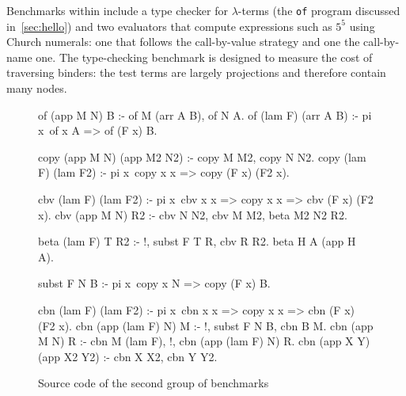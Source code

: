 \documentclass{these-ISSS}
\newenvironment{elpicode}
  {\VerbatimEnvironment\begin{elpibox}\begin{xelpicode}}{\end{xelpicode}
\end{elpibox}}
\begin{document}
Benchmarks within \thefragment{} include a type checker for $\lambda$-terms
(the \verb+of+ program discussed in~\cref{sec:hello}) and two evaluators that
compute expressions such as $5^5$ using Church numerals: one that follows
the call-by-value strategy and one the call-by-name one. The
type-checking benchmark is designed to measure the cost of traversing
binders: the test terms are largely projections and therefore contain many
 nodes.

\begin{figure}
\begin{elpicode}
of (app M N) B :- of M (arr A B), of N A.
of (lam F) (arr A B) :- pi x\ of x A => of (F x) B.

copy (app M N) (app M2 N2) :- copy M M2, copy N N2.
copy (lam F) (lam F2) :- pi x\ copy x x => copy (F x) (F2 x).

cbv (lam F) (lam F2) :- pi x\ cbv x x => copy x x => cbv (F x) (F2 x).
cbv (app M N) R2 :- cbv N N2, cbv M M2, beta M2 N2 R2.

beta (lam F) T R2 :- !, subst F T R, cbv R R2.
beta H A (app H A).

subst F N B :- pi x\ copy x N => copy (F x) B.

cbn (lam F) (lam F2) :- pi x\ cbn x x => copy x x => cbn (F x) (F2 x).
cbn (app (lam F) N) M :- !, subst F N B, cbn B M.
cbn (app M N) R :- cbn M (lam F), !, cbn (app (lam F) N) R.
cbn (app X Y) (app X2 Y2) :- cbn X X2, cbn Y Y2.
\end{elpicode}
\caption{Source code of the second group of benchmarks\label{fig:bench}}
\end{figure}
\end{document}

